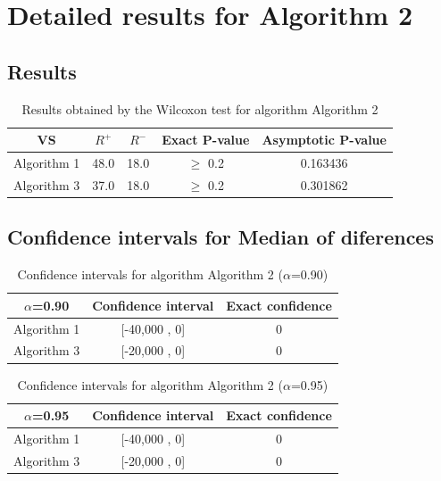 \documentclass[a4paper,10pt]{article}
\begin{document}
 \clearpage 


\section{Detailed results for Algorithm 2}


\subsection{Results}

\begin{table}[!htp]
\centering\small
\begin{tabular}{
|c|c|c|c|c|}
\hline
 VS & $R^{+}$ & $R^{-}$ & Exact P-value & Asymptotic P-value \\ \hline 
Algorithm 1 & 48.0 & 18.0 & $\geq$ 0.2 & 0.163436\\ \hline 
Algorithm 3 & 37.0 & 18.0 & $\geq$ 0.2 & 0.301862\\ \hline 

\end{tabular}
\caption{Results obtained by the Wilcoxon test for algorithm Algorithm 2}
\end{table}

\subsection{Confidence intervals for Median of diferences}

\begin{table}[!htp]
\centering\small
\begin{tabular}{
|c|c|c|}
\hline
 $\alpha$=0.90 & Confidence interval & Exact confidence \\ \hline 
Algorithm 1 & [-40,000 , 0] & 0\\ \hline 
Algorithm 3 & [-20,000 , 0] & 0\\ \hline 

\end{tabular}
\caption{Confidence intervals for algorithm Algorithm 2 ($\alpha$=0.90)}
\end{table}
\begin{table}[!htp]
\centering\small
\begin{tabular}{
|c|c|c|}
\hline
 $\alpha$=0.95 & Confidence interval & Exact confidence \\ \hline 
Algorithm 1 & [-40,000 , 0] & 0\\ \hline 
Algorithm 3 & [-20,000 , 0] & 0\\ \hline 

\end{tabular}
\caption{Confidence intervals for algorithm Algorithm 2 ($\alpha$=0.95)}
\end{table}
\end{document}
